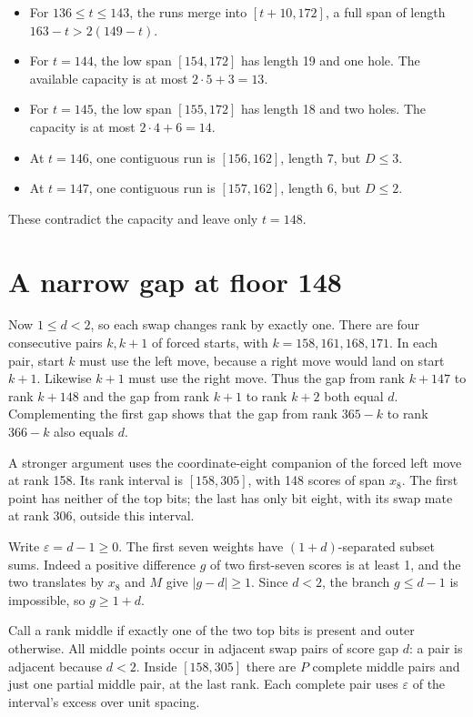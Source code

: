 \documentclass[11pt,letterpaper]{article}
\providecommand{\tightlist}{\setlength{\itemsep}{0pt}\setlength{\parskip}{0pt}}
\begin{document}
\begin{itemize}
\tightlist
\item
  For \(136\le t\le143\), the runs merge into \([t+10,172]\), a full
  span of length \(163-t>2(149-t)\).
\item
  For \(t=144\), the low span \([154,172]\) has length 19 and one hole.
  The available capacity is at most \(2\cdot5+3=13\).
\item
  For \(t=145\), the low span \([155,172]\) has length 18 and two holes.
  The capacity is at most \(2\cdot4+6=14\).
\item
  At \(t=146\), one contiguous run is \([156,162]\), length 7, but
  \(D\le3\).
\item
  At \(t=147\), one contiguous run is \([157,162]\), length 6, but
  \(D\le2\).
\end{itemize}

These contradict the capacity and leave only \(t=148\).

\section{A narrow gap at floor 148}\label{a-narrow-gap-at-floor-148}

Now \(1\le d<2\), so each swap changes rank by exactly one. There are
four consecutive pairs \(k,k+1\) of forced starts, with
\(k=158,161,168,171\). In each pair, start \(k\) must use the left move,
because a right move would land on start \(k+1\). Likewise \(k+1\) must
use the right move. Thus the gap from rank \(k+147\) to rank \(k+148\)
and the gap from rank \(k+1\) to rank \(k+2\) both equal \(d\).
Complementing the first gap shows that the gap from rank \(365-k\) to
rank \(366-k\) also equals \(d\).

A stronger argument uses the coordinate-eight companion of the forced
left move at rank 158. Its rank interval is \([158,305]\), with 148
scores of span \(x_8\). The first point has neither of the top bits; the
last has only bit eight, with its swap mate at rank 306, outside this
interval.

Write \(\varepsilon=d-1\ge0\). The first seven weights have
\((1+d)\)-separated subset sums. Indeed a positive difference \(g\) of
two first-seven scores is at least 1, and the two translates by \(x_8\)
and \(M\) give \(|g-d|\ge1\). Since \(d<2\), the branch \(g\le d-1\) is
impossible, so \(g\ge1+d\).

Call a rank middle if exactly one of the two top bits is present and
outer otherwise. All middle points occur in adjacent swap pairs of score
gap \(d\): a pair is adjacent because \(d<2\). Inside \([158,305]\)
there are \(P\) complete middle pairs and just one partial middle pair,
at the last rank. Each complete pair uses \(\varepsilon\) of the
interval's excess over unit spacing.
\end{document}
